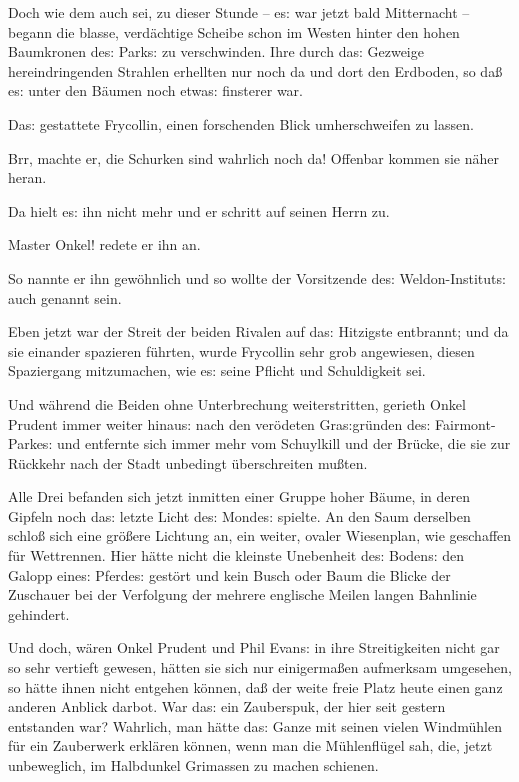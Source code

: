 \documentclass[oneside,12pt]{book}
\newcommand{\s}{s:}
\begin{document}
Doch wie dem auch sei, zu dieser Stunde -- e{\s} war jetzt bald
Mitternacht -- begann die {\glqq}blasse, verd\"achtige Scheibe{\grqq}
schon im Westen hinter den hohen Baumkronen de{\s} Park{\s} zu
verschwinden. Ihre durch da{\s} Gezweige hereindringenden Strahlen
erhellten nur noch da und dort den Erdboden, so da{\ss} e{\s} unter
den B\"aumen noch etwa{\s} finsterer war.

Da{\s} gestattete Frycollin, einen forschenden Blick umherschweifen
zu lassen.

{\glqq}Brr, machte er, die Schurken sind wahrlich noch da! Offenbar
kommen sie n\"aher heran.{\grqq}

Da hielt e{\s} ihn nicht mehr und er schritt auf seinen Herrn zu.

{\glqq}Master Onkel!{\grqq} redete er ihn an.

So nannte er ihn gew\"ohnlich und so wollte der Vorsitzende de{\s}
Weldon-Institut{\s} auch genannt sein.

Eben jetzt war der Streit der beiden Rivalen auf da{\s} Hitzigste
entbrannt; und da sie einander spazieren f\"uhrten, wurde Frycollin
sehr grob angewiesen, diesen Spaziergang mit\/zumachen, wie e{\s}
seine Pflicht und Schuldigkeit sei.

Und w\"ahrend die Beiden ohne Unterbrechung weiterstritten, gerieth
Onkel Prudent immer weiter hinau{\s} nach den ver\"odeten
Gra{\s}gr\"unden de{\s} Fairmont-Parke{\s} und entfernte sich immer
mehr vom Schuylkill und der Br\"ucke, die sie zur R\"uckkehr nach der
Stadt unbedingt \"uberschreiten mu{\ss}ten.

Alle Drei befanden sich jetzt inmitten einer Gruppe hoher B\"aume, in
deren Gipfeln noch da{\s} letzte Licht de{\s} Monde{\s} spielte. An
den Saum derselben schlo{\ss} sich eine gr\"o{\ss}ere Lichtung an,
ein weiter, ovaler Wiesenplan, wie geschaffen f\"ur Wettrennen. Hier
h\"atte nicht die kleinste Unebenheit de{\s} Boden{\s} den Galopp
eine{\s} Pferde{\s} gest\"ort und kein Busch oder Baum die Blicke der
Zuschauer bei der Verfolgung der mehrere englische Meilen langen
Bahnlinie gehindert.

Und doch, w\"aren Onkel Prudent und Phil Evan{\s} in ihre
Streitigkeiten nicht gar so sehr vertieft gewesen, h\"atten sie sich
nur einigerma{\ss}en aufmerksam umgesehen, so h\"atte ihnen nicht
entgehen k\"onnen, da{\ss} der weite freie Platz heute einen ganz
anderen Anblick darbot. War da{\s} ein Zauberspuk, der hier seit
gestern entstanden war? Wahrlich, man h\"atte da{\s} Ganze mit seinen
vielen Windm\"uhlen f\"ur ein Zauberwerk erkl\"aren k\"onnen, wenn
man die M\"uhlenfl\"ugel sah, die, jetzt unbeweglich, im Halbdunkel
Grimassen zu machen schienen.
\end{document}
